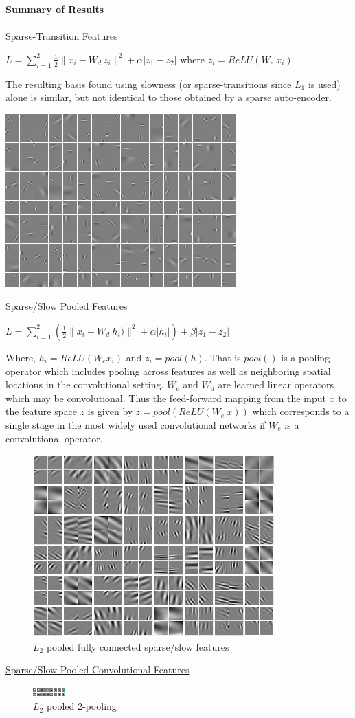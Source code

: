 \documentclass[12pt,a4paper]{report}
\begin{document}
{\bf Summary of Results} \\ \\
\underline{Sparse-Transition Features} 
\begin{center} 
$L = \sum_{i=1} ^2 \frac{1}{2}\|x_i - W_d~z_i\|^2 +\alpha|z_1 - z_2|$ where $z_i = ReLU(W_e~x_i)$ 
\end{center} 
The resulting basis found using slowness (or sparse-transitions since $L_1$ is used) alone is similar, but not identical to those obtained by a sparse auto-encoder.    
\begin{center}
\includegraphics[scale=0.5]{SF.png}
\end{center} 
\underline{Sparse/Slow Pooled Features} 
\begin{center}
 $L = \sum_{i=1} ^2 \left(\frac{1}{2}\|x_i - W_d~h_i)\|^2 +\alpha|h_i|\right) + \beta|z_1 - z_2|$ 
\end{center}   
Where, $h_i = ReLU(W_ex_i)$ and $z_i = pool(h)$. That is $pool()$ is a pooling operator which includes pooling across features as well as neighboring spatial locations in the convolutional setting. $W_e$ and $W_d$ are learned linear operators which may be convolutional. Thus the feed-forward mapping from the input $x$ to the feature space $z$ is given by $z = pool(ReLU(W_e~x))$ which corresponds to a single stage in the most widely used convolutional networks if $W_e$ is a convolutional operator.  
\begin{figure}
\centering
\includegraphics[scale=0.5]{SF_pool_SF.png}
\caption{$L_2$ pooled fully connected sparse/slow features}
\end{figure}  
\newpage

\underline{Sparse/Slow Pooled Convolutional Features} \\

\begin{figure}
\centering
\includegraphics[scale=5]{L2_f2s1.png}
\caption{$L_2$ pooled 2-pooling }
\end{figure} 
\end{document}
